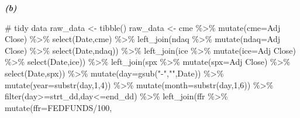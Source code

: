 \documentclass[
  letterpaper,
  DIV=11,
  numbers=noendperiod]{scrreprt}
\newenvironment{Shaded}{\begin{snugshade}}{\end{snugshade}}
\newcommand{\AttributeTok}[1]{\textcolor[rgb]{0.40,0.45,0.13}{#1}}
\newcommand{\CommentTok}[1]{\textcolor[rgb]{0.37,0.37,0.37}{#1}}
\newcommand{\DecValTok}[1]{\textcolor[rgb]{0.68,0.00,0.00}{#1}}
\newcommand{\FunctionTok}[1]{\textcolor[rgb]{0.28,0.35,0.67}{#1}}
\newcommand{\NormalTok}[1]{\textcolor[rgb]{0.00,0.23,0.31}{#1}}
\newcommand{\OtherTok}[1]{\textcolor[rgb]{0.00,0.23,0.31}{#1}}
\newcommand{\SpecialCharTok}[1]{\textcolor[rgb]{0.37,0.37,0.37}{#1}}
\newcommand{\StringTok}[1]{\textcolor[rgb]{0.13,0.47,0.30}{#1}}
\begin{document}
\textbf{\emph{(b)}}

\begin{Shaded}
\begin{Highlighting}[]
\CommentTok{\# tidy data}
\NormalTok{raw\_data }\OtherTok{\textless{}{-}} \FunctionTok{tibble}\NormalTok{()}
\NormalTok{raw\_data }\OtherTok{\textless{}{-}}\NormalTok{ cme }\SpecialCharTok{\%\textgreater{}\%} \FunctionTok{mutate}\NormalTok{(}\AttributeTok{cme=}\StringTok{\textasciigrave{}}\AttributeTok{Adj Close}\StringTok{\textasciigrave{}}\NormalTok{) }\SpecialCharTok{\%\textgreater{}\%} \FunctionTok{select}\NormalTok{(Date,cme) }\SpecialCharTok{\%\textgreater{}\%} 
  \FunctionTok{left\_join}\NormalTok{(ndaq }\SpecialCharTok{\%\textgreater{}\%} \FunctionTok{mutate}\NormalTok{(}\AttributeTok{ndaq=}\StringTok{\textasciigrave{}}\AttributeTok{Adj Close}\StringTok{\textasciigrave{}}\NormalTok{) }\SpecialCharTok{\%\textgreater{}\%} \FunctionTok{select}\NormalTok{(Date,ndaq)) }\SpecialCharTok{\%\textgreater{}\%} 
  \FunctionTok{left\_join}\NormalTok{(ice }\SpecialCharTok{\%\textgreater{}\%} \FunctionTok{mutate}\NormalTok{(}\AttributeTok{ice=}\StringTok{\textasciigrave{}}\AttributeTok{Adj Close}\StringTok{\textasciigrave{}}\NormalTok{) }\SpecialCharTok{\%\textgreater{}\%} \FunctionTok{select}\NormalTok{(Date,ice)) }\SpecialCharTok{\%\textgreater{}\%} 
  \FunctionTok{left\_join}\NormalTok{(spx }\SpecialCharTok{\%\textgreater{}\%} \FunctionTok{mutate}\NormalTok{(}\AttributeTok{spx=}\StringTok{\textasciigrave{}}\AttributeTok{Adj Close}\StringTok{\textasciigrave{}}\NormalTok{) }\SpecialCharTok{\%\textgreater{}\%} \FunctionTok{select}\NormalTok{(Date,spx)) }\SpecialCharTok{\%\textgreater{}\%} 
  \FunctionTok{mutate}\NormalTok{(}\AttributeTok{day=}\FunctionTok{gsub}\NormalTok{(}\StringTok{"{-}"}\NormalTok{,}\StringTok{""}\NormalTok{,Date)) }\SpecialCharTok{\%\textgreater{}\%} 
  \FunctionTok{mutate}\NormalTok{(}\AttributeTok{year=}\FunctionTok{substr}\NormalTok{(day,}\DecValTok{1}\NormalTok{,}\DecValTok{4}\NormalTok{)) }\SpecialCharTok{\%\textgreater{}\%} 
  \FunctionTok{mutate}\NormalTok{(}\AttributeTok{month=}\FunctionTok{substr}\NormalTok{(day,}\DecValTok{1}\NormalTok{,}\DecValTok{6}\NormalTok{)) }\SpecialCharTok{\%\textgreater{}\%} 
  \FunctionTok{filter}\NormalTok{(day}\SpecialCharTok{\textgreater{}=}\NormalTok{strt\_dd,day}\SpecialCharTok{\textless{}=}\NormalTok{end\_dd) }\SpecialCharTok{\%\textgreater{}\%} 
  \FunctionTok{left\_join}\NormalTok{(ffr }\SpecialCharTok{\%\textgreater{}\%} 
              \FunctionTok{mutate}\NormalTok{(}\AttributeTok{ffr=}\NormalTok{FEDFUNDS}\SpecialCharTok{/}\DecValTok{100}\NormalTok{,}

\end{Highlighting}
\end{Shaded}
\end{document}
